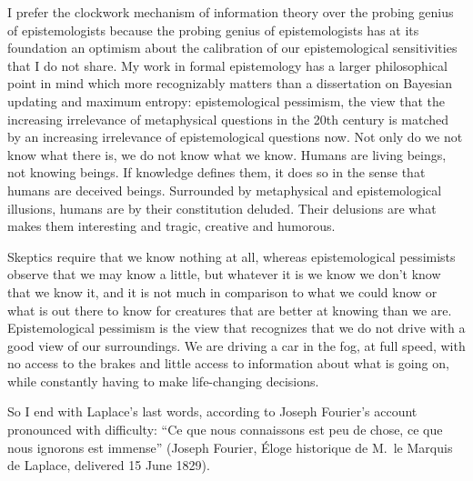\documentclass[phd,12pt,oneside]{ubcthesis}
\begin{document}
I prefer the clockwork mechanism of information theory over the
probing genius of epistemologists because the probing genius of
epistemologists has at its foundation an optimism about the
calibration of our epistemological sensitivities that I do not share.
My work in formal epistemology has a larger philosophical point in
mind which more recognizably matters than a dissertation on Bayesian
updating and maximum entropy: epistemological pessimism, the view that
the increasing irrelevance of metaphysical questions in the 20th
century is matched by an increasing irrelevance of epistemological
questions now. Not only do we not know what there is, we do not know
what we know. Humans are living beings, not knowing beings. If
knowledge defines them, it does so in the sense that humans are
deceived beings. Surrounded by metaphysical and epistemological
illusions, humans are by their constitution deluded. Their delusions
are what makes them interesting and tragic, creative and humorous.

Skeptics require that we know nothing at all, whereas epistemological
pessimists observe that we may know a little, but whatever it is we
know we don't know that we know it, and it is not much in comparison
to what we could know or what is out there to know for creatures that
are better at knowing than we are. Epistemological pessimism is the
view that recognizes that we do not drive with a good view of our
surroundings. We are driving a car in the fog, at full speed, with no
access to the brakes and little access to information about what is
going on, while constantly having to make life-changing decisions. 


So I end with Laplace's last words, according to Joseph Fourier's
account pronounced with difficulty: ``Ce que nous connaissons est peu
de chose, ce que nous ignorons est immense'' (Joseph Fourier,
{\'E}loge historique de M.~le Marquis de Laplace, delivered 15 June
1829).


% 
 

\end{document}
